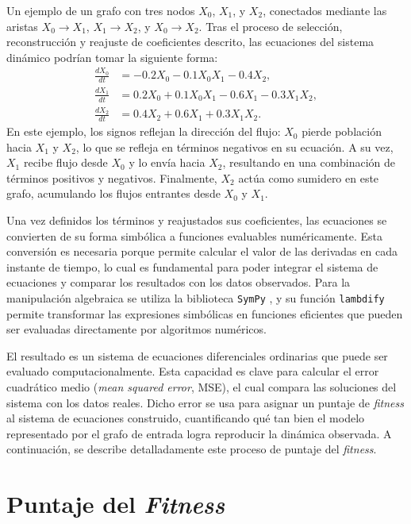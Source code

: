 Un ejemplo de un grafo con tres nodos \(X_0\), \(X_1\), y \(X_2\), conectados mediante las aristas \(X_0 \rightarrow X_1\), \(X_1 \rightarrow X_2\), y 
\(X_0 \rightarrow X_2\). Tras el proceso de selección, reconstrucción y reajuste de coeficientes descrito, las ecuaciones del sistema dinámico podrían 
tomar la siguiente forma:
\begin{align*}
\frac{dX_0}{dt} &= -0.2 X_0 - 0.1 X_0 X_1 - 0.4 X_2, \\
\frac{dX_1}{dt} &= 0.2 X_0 + 0.1 X_0 X_1 - 0.6 X_1 - 0.3 X_1 X_2, \\
\frac{dX_2}{dt} &= 0.4 X_2 + 0.6 X_1 + 0.3 X_1 X_2.
\end{align*}
En este ejemplo, los signos reflejan la dirección del flujo: \(X_0\) pierde población hacia \(X_1\) y \(X_2\), lo que se refleja en términos negativos en su 
ecuación. A su vez, \(X_1\) recibe flujo desde \(X_0\) y lo envía hacia \(X_2\), resultando en una combinación de términos positivos y negativos. Finalmente, 
\(X_2\) actúa como sumidero en este grafo, acumulando los flujos entrantes desde \(X_0\) y \(X_1\).

Una vez definidos los términos y reajustados sus coeficientes, las ecuaciones se convierten de su forma simbólica a funciones evaluables numéricamente. Esta conversión 
es necesaria porque permite calcular el valor de las derivadas en cada instante de tiempo, lo cual es fundamental para poder integrar el sistema de ecuaciones y 
comparar los resultados con los datos observados. Para la manipulación algebraica se utiliza la biblioteca \texttt{SymPy} \cite{SymPy2017}, y su función 
\texttt{lambdify} permite transformar las expresiones simbólicas en funciones eficientes que pueden ser evaluadas directamente por algoritmos numéricos.

El resultado es un sistema de ecuaciones diferenciales ordinarias que puede ser evaluado computacionalmente. Esta capacidad es clave para calcular el error cuadrático 
medio (\textit{mean squared error}, MSE), el cual compara las soluciones del sistema con los datos reales. Dicho error se usa para asignar un puntaje de \textit{fitness} 
al sistema de ecuaciones construido, cuantificando qué tan bien el modelo representado por el grafo de entrada logra reproducir la dinámica observada. A continuación, 
se describe detalladamente este proceso de puntaje del \textit{fitness}.

\section{Puntaje del \textit{Fitness}}
\label{sec:punt_fit}

